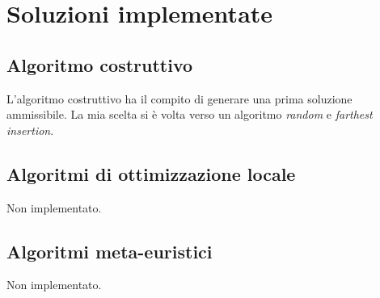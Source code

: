 \chapter*{Soluzioni implementate}
\label{cha_soluzioni}

\section*{Algoritmo costruttivo}
\label{sec_costruttivo}
L'algoritmo costruttivo ha il compito di generare una prima soluzione ammissibile. La mia scelta si è volta verso un algoritmo \emph{random} e \emph{farthest insertion}. \\
\noindent 

\section*{Algoritmi di ottimizzazione locale}
\label{sec_ottimizzazione}
Non implementato.

\section*{Algoritmi meta-euristici}
\label{sec_metaeuristici}
Non implementato.
